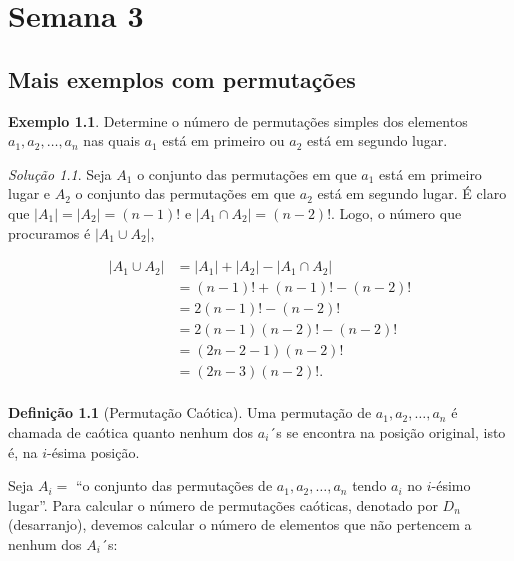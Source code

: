 \documentclass[]{book}
\theoremstyle{definition}
\newtheorem{definition}{Definição}[chapter]
\theoremstyle{definition}
\newtheorem{example}{Exemplo}[chapter]
\theoremstyle{definition}
\theoremstyle{remark}
\newtheorem*{solution}{Solução}
\begin{document}
\hypertarget{sem3}{%
\chapter{Semana 3}\label{sem3}}

\hypertarget{mais-exemplos-com-permutauxe7uxf5es}{%
\section{Mais exemplos com permutações}\label{mais-exemplos-com-permutauxe7uxf5es}}

\begin{example}
\protect\hypertarget{exm:unnamed-chunk-102}{}{\label{exm:unnamed-chunk-102} }Determine o número de permutações simples dos elementos \(a_1, a_2, \ldots, a_n\) nas quais \(a_1\) está em primeiro ou \(a_2\) está em segundo lugar.
\end{example}

\begin{solution}
\iffalse{} {Solução. } \fi{}Seja \(A_1\) o conjunto das permutações em que \(a_1\) está em primeiro lugar e \(A_2\) o conjunto das permutações em que \(a_2\) está em segundo lugar.
É claro que \(|A_1|=|A_2|=(n-1)!\) e \(|A_1 \cap A_2| = (n-2)!\).
Logo, o número que procuramos é \(|A_1\cup A_2|\),

\begin{align}
|A_1\cup A_2| &= |A_1| + |A_2| - |A_1 \cap A_2| \\
&= (n-1)! + (n-1)! - (n-2)!\\
&= 2(n-1)! - (n-2)!\\
&= 2(n-1)(n-2)! - (n-2)!\\
&= (2n - 2-1)(n-2)!\\
&= (2n-3)(n-2)!.\\
\end{align}
\end{solution}

\begin{definition}[Permutação Caótica]
\protect\hypertarget{def:defPermCaotica}{}{\label{def:defPermCaotica} \iffalse (Permutação Caótica) \fi{} }Uma permutação de \(a_1, a_2, \ldots, a_n\) é chamada de caótica quanto nenhum dos \(a_i\)´s se encontra na posição original, isto é, na \(i\)-ésima posição.
\end{definition}

Seja \(A_i=\) ``o conjunto das permutações de \(a_1, a_2, \ldots, a_n\) tendo \(a_i\) no \(i\)-ésimo lugar''.
Para calcular o número de permutações caóticas, denotado por \(D_n\) (desarranjo), devemos calcular o número de elementos que não pertencem a nenhum dos \(A_i\)´s:
\end{document}
